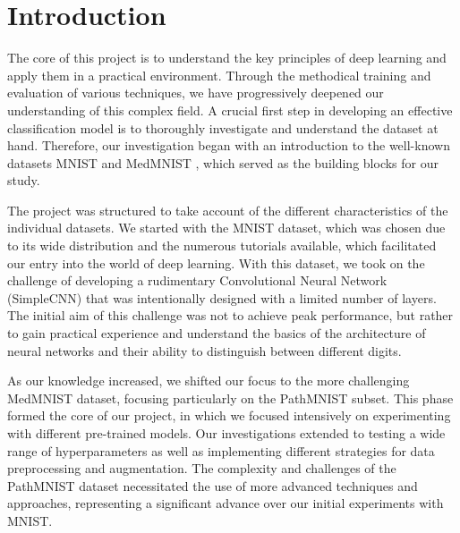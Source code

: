 \section{Introduction}\label{intro}

The core of this project is to understand the key principles of deep learning and apply them in a practical environment. Through the methodical training and evaluation of various techniques, we have progressively deepened our understanding of this complex field. A crucial first step in developing an effective classification model is to thoroughly investigate and understand the dataset at hand. Therefore, our investigation began with an introduction to the well-known datasets MNIST \citep{deng2012mnist} and MedMNIST \citep{medmnistv1}, which served as the building blocks for our study.

The project was structured to take account of the different characteristics of the individual datasets. We started with the MNIST dataset, which was chosen due to its wide distribution and the numerous tutorials available, which facilitated our entry into the world of deep learning. With this dataset, we took on the challenge of developing a rudimentary Convolutional Neural Network (SimpleCNN) that was intentionally designed with a limited number of layers. The initial aim of this challenge was not to achieve peak performance, but rather to gain practical experience and understand the basics of the architecture of neural networks and their ability to distinguish between different digits.

As our knowledge increased, we shifted our focus to the more challenging MedMNIST dataset, focusing particularly on the PathMNIST subset. This phase formed the core of our project, in which we focused intensively on experimenting with different pre-trained models. Our investigations extended to testing a wide range of hyperparameters as well as implementing different strategies for data preprocessing and augmentation. The complexity and challenges of the PathMNIST dataset necessitated the use of more advanced techniques and approaches, representing a significant advance over our initial experiments with MNIST.\@


